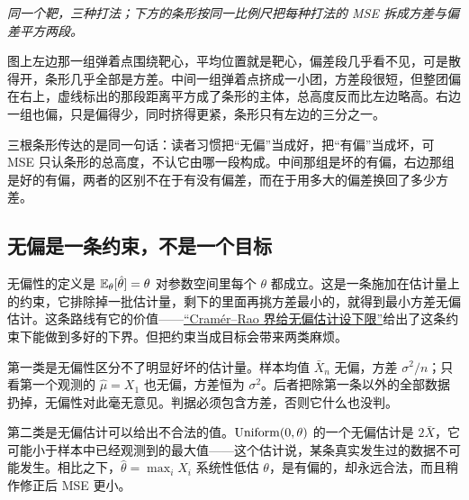 \begin{center}

\emph{同一个靶，三种打法；下方的条形按同一比例尺把每种打法的 MSE 拆成方差与偏差平方两段。}
\end{center}

图上左边那一组弹着点围绕靶心，平均位置就是靶心，偏差段几乎看不见，可是散得开，条形几乎全部是方差。中间一组弹着点挤成一小团，方差段很短，但整团偏在右上，虚线标出的那段距离平方成了条形的主体，总高度反而比左边略高。右边一组也偏，只是偏得少，同时挤得更紧，条形只有左边的三分之一。

三根条形传达的是同一句话：读者习惯把``无偏''当成好，把``有偏''当成坏，可 MSE 只认条形的总高度，不认它由哪一段构成。中间那组是坏的有偏，右边那组是好的有偏，两者的区别不在于有没有偏差，而在于用多大的偏差换回了多少方差。

\subsection{无偏是一条约束，不是一个目标}

无偏性的定义是 \(\mathbb{E}_\theta[\hat\theta]=\theta\) 对参数空间里每个 \(\theta\) 都成立。这是一条施加在估计量上的约束，它排除掉一批估计量，剩下的里面再挑方差最小的，就得到最小方差无偏估计。这条路线有它的价值——\hyperref[sec:11-Mathematical-Statistics/03-Sufficient-Statistics-and-Information/03]{``Cramér--Rao 界给无偏估计设下限''}给出了这条约束下能做到多好的下界。但把约束当成目标会带来两类麻烦。

第一类是无偏性区分不了明显好坏的估计量。样本均值 \(\bar X_n\) 无偏，方差 \(\sigma^2/n\)；只看第一个观测的 \(\hat\mu=X_1\) 也无偏，方差恒为 \(\sigma^2\)。后者把除第一条以外的全部数据扔掉，无偏性对此毫无意见。判据必须包含方差，否则它什么也没判。

第二类是无偏估计可以给出不合法的值。\(\operatorname{Uniform}(0,\theta)\) 的一个无偏估计是 \(2\bar X\)，它可能小于样本中已经观测到的最大值——这个估计说，某条真实发生过的数据不可能发生。相比之下，\(\hat\theta=\max_i X_i\) 系统性低估 \(\theta\)，是有偏的，却永远合法，而且稍作修正后 MSE 更小。

